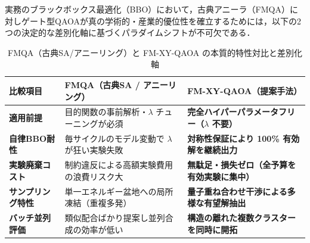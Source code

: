 \documentclass[11pt,a4paper]{ltjsarticle}
\begin{document}
実務のブラックボックス最適化（BBO）において，古典アニーラ（FMQA）に対しゲート型QAOAが真の学術的・産業的優位性を確立するためには，以下の2つの決定的な差別化軸に基づくパラダイムシフトが不可欠である．

\begin{table}[H]
\centering
\caption{FMQA（古典SA/アニーリング）と FM-XY-QAOA の本質的特性対比と差別化軸}\label{tab:differentiation_comparison}
\vspace{1mm}
\footnotesize
\setlength{\tabcolsep}{4.5pt}
\renewcommand{\arraystretch}{1.18}
\begin{tabularx}{\textwidth}{lXX}
\toprule
\textbf{比較項目} & \textbf{FMQA（古典SA / アニーリング）} & \textbf{FM-XY-QAOA（提案手法）} \\
\midrule
\textbf{適用前提} & 目的関数の事前解析・$\lambda$ チューニングが必須 & \textbf{完全ハイパーパラメータフリー（$\lambda$ 不要）} \\
\textbf{自律BBO耐性} & 毎サイクルのモデル変動で $\lambda$ が狂い実験失敗 & \textbf{対称性保証により 100\% 有効解を継続出力} \\
\textbf{実験廃棄コスト} & 制約違反による高額実験費用の浪費リスク大 & \textbf{無駄足・損失ゼロ（全予算を有効実験に集中）} \\
\textbf{サンプリング特性} & 単一エネルギー盆地への局所凍結（重複多発） & \textbf{量子重ね合わせ干渉による多様な有望解抽出} \\
\textbf{バッチ並列評価} & 類似配合ばかり提案し並列合成の効率が低い & \textbf{構造の離れた複数クラスターを同時に開拓} \\
\bottomrule
\end{tabularx}
\end{table}
\end{document}
